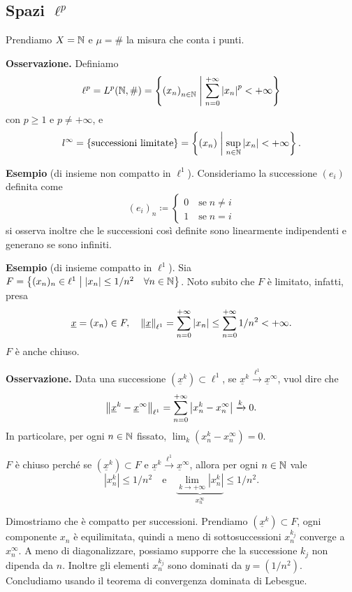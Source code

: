 \subsection{Spazi $\ell^p$}

Prendiamo $X = \mathbb N$ e $\mu = \#$ la misura che conta i punti.

\textbf{Osservazione.} Definiamo
%
$$
\ell^p = L^p(\mathbb N, \#) = \left\{ \left( x_n \right)_{n \in \mathbb N} \;\middle|\; \sum_{n=0}^{+\infty} \left| x_n \right|^p < +\infty  \right\}
$$
con $p \geq 1$ e $p \neq +\infty$, e
%
$$
l^{\infty} = \left\{ \text{successioni limitate} \right\} = \left\{ \left( x_n \right) \;\middle|\; \sup_{n \in \mathbb N}\left| x_n \right| < +\infty \right\}.
$$
%

\textbf{Esempio} (di insieme non compatto in $\ell^1$). Consideriamo la successione $\left( e_i \right)$ definita come
%
$$
(e_i)_n \coloneqq 
\begin{cases}
0 \quad \text{se} \; n \neq i \\
1 \quad \text{se} \; n = i
\end{cases} 
$$
%
si osserva inoltre che le successioni così definite sono linearmente indipendenti e generano se sono infiniti.

\textbf{Esempio} (di insieme compatto in $\ell^1$). Sia $F = \left\{ (x_n)_n \in \ell^1 \;\middle|\; \left| x_n \right| \leq 1 / n^2 \quad \forall n \in \mathbb N \right\}$.
Noto subito che $F$ è limitato, infatti, presa
%
$$
\underline{x} = (x_n) \in F, \quad  \left\lVert \underline{x} \right\rVert_{\ell^1} = \sum_{n=0}^{+\infty} \left| x_n \right| \leq
\sum_{n=0}^{+\infty} 1 / n^2 < +\infty.  
$$
%
$F$ è anche chiuso.

\textbf{Osservazione.} Data una successione $(\underline{x}^k) \subset \ell^1$, se $\underline{x}^k \xrightarrow{\ell^1} \underline{x}^{\infty}$, vuol dire che
%
$$
\left\lVert \underline{x}^k - \underline{x}^\infty \right\rVert_{\ell^1} = \sum_{n = 0}^{+\infty}  \left| x_n^k - x_n^\infty \right| \xrightarrow{k} 0. 
$$
%
In particolare, per ogni $n \in \mathbb N$ fissato, $\lim_k (x_n^k - x_n^\infty) = 0$.

$F$ è chiuso perché se $(\underline{x}^k) \subset F$ e $\underline{x}^k \xrightarrow{\ell^1} \underline{x}^\infty$, allora per ogni $n \in \mathbb N$ vale 
%
$$
\left| x_n^k \right| \leq 1 / n^2 \quad \text{e} \quad \underbrace{\lim_{k \to +\infty} \left| x_n^k  \right|}_{x_n^\infty} \leq 1/n^2.
$$
%

Dimostriamo che è compatto per successioni.
Prendiamo $( \underline{x}^k ) \subset F$, ogni componente $x_n$ è equilimitata, quindi a meno di sottosuccessioni $x_n^{k_j}$ converge a $x_n^\infty$.
A meno di diagonalizzare, possiamo supporre che la successione $k_j$ non dipenda da $n$.
Inoltre gli elementi $x_n^{k_j}$ sono dominati da $y = (1 / n^2)$. Concludiamo usando il teorema di convergenza dominata di Lebesgue.

